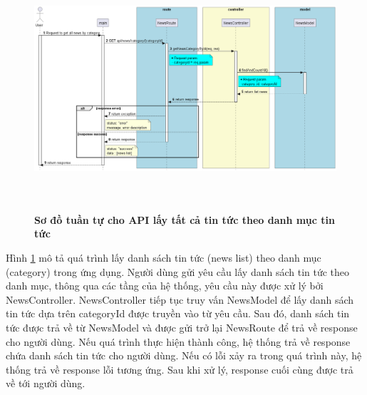 \begin{figure}[H]
  \centering
  \includegraphics[width=16cm,height=9cm]{Images/server/sequence/server/getNewsByCategory.png}
  \caption[Sơ đồ tuần tự cho API lấy tất cả tin tức theo loại tin tức ]{\bfseries \fontsize{12pt}{0pt}
  \selectfont Sơ đồ tuần tự cho API lấy tất cả tin tức theo danh mục tin tức }
  \label{getNewsByCategory} %
\end{figure}
Hình \ref{getNewsByCategory} mô tả quá trình lấy danh sách tin tức (news list) theo danh mục (category) trong ứng dụng. Người dùng gửi yêu cầu lấy danh sách tin tức theo danh mục, thông qua các tầng của hệ thống, yêu cầu này được xử lý bởi NewsController. NewsController tiếp tục truy vấn NewsModel để lấy danh sách tin tức dựa trên categoryId được truyền vào từ yêu cầu. Sau đó, danh sách tin tức được trả về từ NewsModel và được gửi trở lại NewsRoute để trả về response cho người dùng. Nếu quá trình thực hiện thành công, hệ thống trả về response chứa danh sách tin tức cho người dùng. Nếu có lỗi xảy ra trong quá trình này, hệ thống trả về response lỗi tương ứng. Sau khi xử lý, response cuối cùng được trả về tới người dùng.



